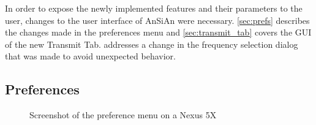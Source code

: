 In order to expose the newly implemented features and their parameters to the user, changes to the user interface of \ac{AnSiAn} were necessary. \autoref{sec:prefs} describes the changes made in the preferences menu and \autoref{sec:transmit_tab} covers the \ac{GUI} of the new Transmit Tab. \label{sec:freq_dialog} addresses a change in the frequency selection dialog that was made to avoid unexpected behavior.


\subsection{Preferences\label{sec:prefs}}

\begin{figure}
\centering
{}
\hfill\null
{}
\caption{Screenshot of the preference menu on a Nexus 5X}
\label{fig:demod_prefs}
\end{figure}

